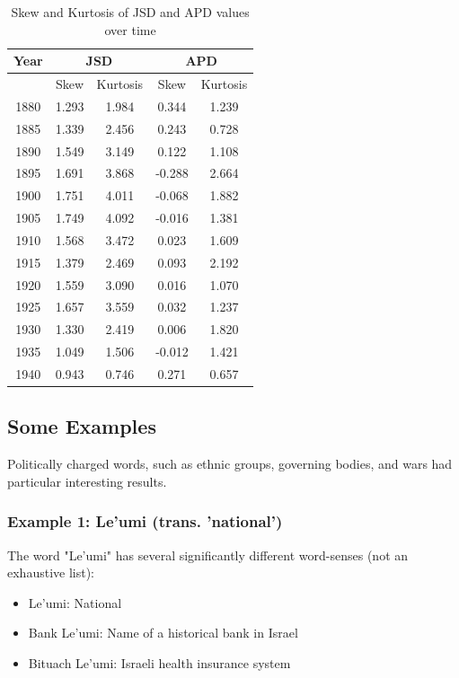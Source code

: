 \documentclass[10pt, a4paper]{article}
\begin{document}
\begin{table}[!h]
\label{SkewKurtosis_JSDandAPD}
\begin{center}
\begin{tabularx}{\columnwidth}{|c|c|c|c|c|}

      \hline
      Year&\multicolumn{2}{c}{JSD}&\multicolumn{2}{c}{APD}\\
      \hline
      &Skew&Kurtosis&Skew&Kurtosis \\
      \hline
      1880&1.293&1.984&0.344&1.239\\
      \hline
      1885&1.339&2.456&0.243&0.728\\
      \hline
      1890&1.549&3.149&0.122&1.108\\
      \hline
      1895&1.691&3.868&-0.288&2.664\\
      \hline
      1900&1.751&4.011&-0.068&1.882\\
      \hline
      1905&1.749&4.092&-0.016&1.381\\
      \hline
      1910&1.568&3.472&0.023&1.609\\
      \hline
      1915&1.379&2.469&0.093&2.192\\
      \hline
      1920&1.559&3.090&0.016&1.070\\
      \hline
      1925&1.657&3.559&0.032&1.237\\
      \hline
      1930&1.330&2.419&0.006&1.820\\
      \hline
      1935&1.049&1.506&-0.012&1.421\\
      \hline
      1940&0.943&0.746&0.271&0.657\\
      \hline

\end{tabularx}
\caption{Skew and Kurtosis of JSD and APD values over time}
 \end{center}
\end{table}

\subsection{Some Examples}
Politically charged words, such as ethnic groups, governing bodies, and wars had particular interesting results. 
\subsubsection{Example 1: Le'umi (trans. 'national')}
The word "Le'umi" has several significantly different word-senses (not an exhaustive list):
\begin{itemize}
    \item Le'umi: National
    \item Bank Le'umi: Name of a historical bank in Israel
    \item Bituach Le'umi: Israeli health insurance system
\end{itemize}
\end{document}
